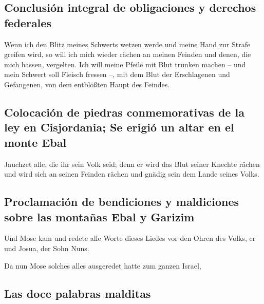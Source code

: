 \hypertarget{conclusiuxf3n-integral-de-obligaciones-y-derechos-federales}{%
\subsection{Conclusión integral de obligaciones y derechos
federales}\label{conclusiuxf3n-integral-de-obligaciones-y-derechos-federales}}

 Wenn ich den Blitz meines Schwerts wetzen werde und
meine Hand zur Strafe greifen wird, so will ich mich wieder rächen an
meinen Feinden und denen, die mich hassen, vergelten. 
Ich will meine Pfeile mit Blut trunken machen -- und mein Schwert soll
Fleisch fressen --, mit dem Blut der Erschlagenen und Gefangenen, von
dem entblößten Haupt des Feindes.

\hypertarget{colocaciuxf3n-de-piedras-conmemorativas-de-la-ley-en-cisjordania-se-erigiuxf3-un-altar-en-el-monte-ebal}{%
\subsection{Colocación de piedras conmemorativas de la ley en
Cisjordania; Se erigió un altar en el monte
Ebal}\label{colocaciuxf3n-de-piedras-conmemorativas-de-la-ley-en-cisjordania-se-erigiuxf3-un-altar-en-el-monte-ebal}}

 Jauchzet alle, die ihr sein Volk seid; denn er wird das
Blut seiner Knechte rächen und wird sich an seinen Feinden rächen und
gnädig sein dem Lande seines Volks.

\hypertarget{proclamaciuxf3n-de-bendiciones-y-maldiciones-sobre-las-montauxf1as-ebal-y-garizim}{%
\subsection{Proclamación de bendiciones y maldiciones sobre las montañas
Ebal y
Garizim}\label{proclamaciuxf3n-de-bendiciones-y-maldiciones-sobre-las-montauxf1as-ebal-y-garizim}}

 Und Mose kam und redete alle Worte dieses Liedes vor den
Ohren des Volks, er und Josua, der Sohn Nuns.

 Da nun Mose solches alles ausgeredet hatte zum ganzen
Israel,

\hypertarget{las-doce-palabras-malditas}{%
\subsection{Las doce palabras
malditas}\label{las-doce-palabras-malditas}}

